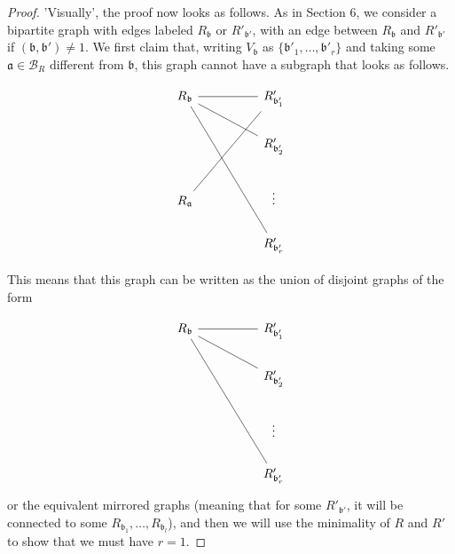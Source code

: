 \documentclass[10pt,a4paper]{amsart}
\newcommand{\cb}{\mathcal{B}}
\newcommand{\ga}{\mathfrak{a}}
\newcommand{\gb}{\mathfrak{b}}
\begin{document}
\begin{proof}
				'Visually', the proof now looks as follows. As in Section 6, we consider a bipartite graph with edges labeled $R_\gb$ or $R'_{\gb'}$, with an edge between $R_\gb$ and  $R'_{\gb'}$ if $(\gb,\gb') \neq 1$. We first claim that, writing $V_\gb$ as $\{\gb'_1,\dots,\gb'_r\}$ and taking some $\ga \in \cb_R$ different from $\gb$, this graph cannot have a subgraph that looks as follows.
				
				\[\begin{tikzcd}
					{R_\gb} && {R'_{\gb'_1}} \\
					&& {R'_{\gb'_2}} \\
					{R_\ga} && \vdots \\
					&& {R'_{\gb'_r}}
					\arrow[no head, from=1-1, to=1-3]
					\arrow[no head, from=1-3, to=3-1]
					\arrow[no head, from=2-3, to=1-1]
					\arrow[no head, from=4-3, to=1-1]
				\end{tikzcd}\]
				
				This means that this graph can be written as the union of disjoint graphs of the form 
				
				\[\begin{tikzcd}
					{R_\gb} && {R'_{\gb'_1}} \\
					&& {R'_{\gb'_2}} \\
					&& \vdots \\
					&& {R'_{\gb'_r}}
					\arrow[no head, from=1-1, to=1-3]
					\arrow[no head, from=2-3, to=1-1]
					\arrow[no head, from=4-3, to=1-1]
				\end{tikzcd}\] or the equivalent mirrored graphs (meaning that for some $R'_{\gb'}$, it will be connected to some $R_{\gb_1}, \dots,R_{\gb_l}$), and then we will use the minimality of $R$ and $R'$ to show that we must have $r = 1$.
				

\end{proof}
\end{document}
